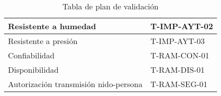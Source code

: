 \begin{table}[H]
\begin{tabular}{|l|l|}
Resistente a humedad                                                                                                 & T-IMP-AYT-02                              \\ \hline
Resistente a presión                                                                                                 & T-IMP-AYT-03                              \\ \hline
Confiabilidad                                                                                                        & T-RAM-CON-01                              \\ \hline
Disponibilidad                                                                                                       & T-RAM-DIS-01                              \\ \hline
Autorización transmisión nido-persona                                                                                & T-RAM-SEG-01                              \\ \hline
\end{tabular}
\caption{Tabla de plan de validación}
\end{table}